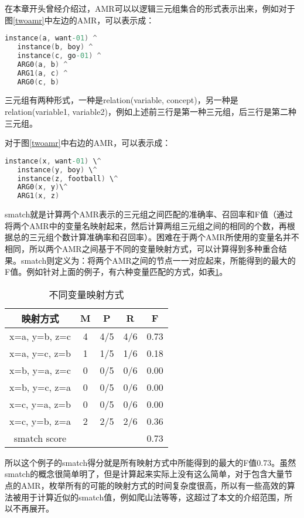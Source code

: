 \documentclass[master, winfont]{njuthesis}
\begin{document}
在本章开头曾经介绍过，AMR可以以逻辑三元组集合的形式表示出来，例如对于图\ref{twoamr}中左边的AMR，可以表示成：
\begin{lstlisting}[language=C]
   instance(a, want-01) ^ 
   instance(b, boy) ^ 
   instance(c, go-01) ^ 
   ARG0(a, b) ^ 
   ARG1(a, c) ^ 
   ARG0(c, b)
\end{lstlisting}

三元组有两种形式，一种是relation(variable, concept)，另一种是relation(variable1, variable2)，例如上述前三行是第一种三元组，后三行是第二种三元组。

对于图\ref{twoamr}中右边的AMR，可以表示成：
\begin{lstlisting}[language=C]
   instance(x, want-01) \^
   instance(y, boy) \^ 
   instance(z, football) \^
   ARG0(x, y)\^
   ARG1(x, z)
\end{lstlisting}

smatch就是计算两个AMR表示的三元组之间匹配的准确率、召回率和F值（通过将两个AMR中的变量名映射起来，然后计算两组三元组之间的相同的个数，再根据总的三元组个数计算准确率和召回率）。困难在于两个AMR所使用的变量名并不相同，所以两个AMR之间基于不同的变量映射方式，可以计算得到多种重合结果。smatch则定义为：将两个AMR之间的节点一一对应起来，所能得到的最大的F值。例如针对上面的例子，有六种变量匹配的方式，如表\ref{smatch_table}。

\begin{table}[!htbp]
\begin{center}
\begin{tabular}{c|c|c|c|c}
\hline {映射方式} & {M} & {P} & {R} & {F} \\
\hline x=a, y=b, z=c & 4 & 4/5 & 4/6 & 0.73 \\
\hline x=a, y=c, z=b & 1 & 1/5 & 1/6 & 0.18 \\
\hline x=b, y=a, z=c & 0 & 0/5 & 0/6 & 0.00 \\
\hline x=b, y=c, z=a & 0 & 0/5 & 0/6 & 0.00 \\
\hline x=c, y=a, z=b & 0 & 0/5 & 0/6 & 0.00 \\
\hline x=c, y=b, z=a & 2 & 2/5 & 2/6 & 0.36 \\
\hline smatch score & \multicolumn{4}{r}{0.73}\\
\hline
\end{tabular}
\end{center}
\caption{\label{smatch_table} 不同变量映射方式}
\end{table}

所以这个例子的smatch得分就是所有映射方式中所能得到的最大的F值0.73。虽然smatch的概念很简单明了，但是计算起来实际上没有这么简单，对于包含大量节点的AMR，枚举所有的可能的映射方式的时间复杂度很高，所以有一些高效的算法被用于计算近似的smatch值，例如爬山法等等，这超过了本文的介绍范围，所以不再展开。
\end{document}
